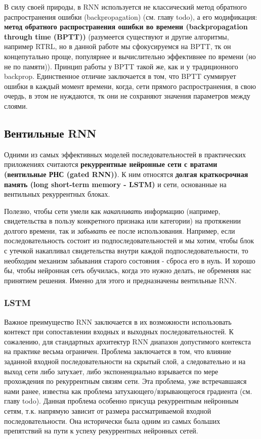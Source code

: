 В силу своей природы, в RNN используется не классический метод обратного 
распространения ошибки (backpropagation) 
(см. главу {\color{red} todo}), а его модификация: 
\textbf{метод обратного распространения ошибки во времени 
(backpropagation through time (BPTT))} (разумеется существуют 
и другие алгоритмы, например RTRL, но в данной работе мы сфокусируемся на 
BPTT, тк он концепутально проще, популярнее и вычислительно эффективнее по времени 
(но не по памяти)). Принцип работы у BPTT такой же, как и у 
традиционного backprop. Единственное отличие заключается в том, что BPTT 
суммирует ошибки в каждый момент времени, когда, сети прямого распространения, 
в свою очердь, в этом не нуждаются, тк они не сохраняют значения параметров между 
слоями.


\subsection{Вентильные RNN}

Одними из самых эффективных моделей последовательностей в практических 
приложениях считаются \textbf{рекуррентные нейронные сети с вратами 
(вентильные РНС (gated RNN))}. К ним относятся
\textbf{долгая краткосрочная память (long short-term memory - LSTM)} 
и сети, основанные на вентильных рекуррентных блоках. 

Полезно, чтобы сети умели как \textit{накапливать} информацию 
(например, свидетельства в пользу конкретного признака или категории) на 
протяжении долгого времени, так и \textit{забывать} ее после использования. 
Например, если последовательность состоит из подпоследовательностей 
и мы хотим, чтобы блок с утечкой накапливал свидетельства
внутри каждой подпоследовательности, то необходим механизм забывания старого
состояния - сброса его в нуль. И хорошо бы, чтобы нейронная сеть обучилась, 
когда это нужно делать, не обременяя нас принятием решения. 
Именно для этого и предназначены вентильные RNN.

\subsubsection{LSTM}

Важное преимущество RNN заключается в их возможности использовать 
контекст при сопоставлении входных и выходных последовательностей. 
К сожалению, для стандартных архитектур RNN диапазон допустимого контекста 
на практике весьма ограничен. Проблема заключается в том, что влияние 
заданной входной последовательности на скрытый слой, а следовательно и 
на выход сети либо затухает, либо экспоненциально взрывается по мере 
прохождения по рекуррентным связям сети. Эта проблема, уже встречавшаяся 
нами ранее, известна как проблема затухающего/взрывающегося градиента 
(см. главу {\color{red} todo}). Данная проблема особенно присуща 
рекуррентным нейронным сетям, т.к. напрямую зависит от размера рассматриваемой 
входной последовательности. Она исторически была одним из самых 
больших препятствий на пути к успеху рекуррентных нейронных сетей.

